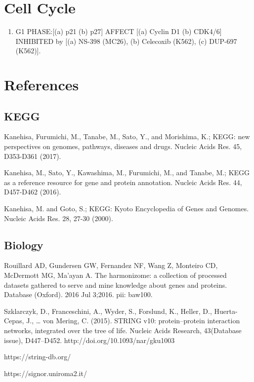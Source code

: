 

\section{Cell Cycle}

\begin{enumerate}
	\item G1 PHASE:[(a) p21 (b) p27] AFFECT [(a) Cyclin D1 (b) CDK4/6] INHIBITED by [(a) NS-398 (MC26), (b) Celecoxib (K562), (c) DUP-697 (K562)]. \cite{key4000}
\end{enumerate}


\section{References}


\subsection{KEGG}

 Kanehisa, Furumichi, M., Tanabe, M., Sato, Y., and Morishima, K.; 
\newblock KEGG: new perspectives on genomes, pathways, diseases and drugs. 
\newblock Nucleic Acids Res. 45, D353-D361 (2017).

 Kanehisa, M., Sato, Y., Kawashima, M., Furumichi, M., and Tanabe, M.; 
\newblock KEGG as a reference resource for gene and protein annotation. 
\newblock Nucleic Acids Res. 44, D457-D462 (2016).

 Kanehisa, M. and Goto, S.; 
\newblock KEGG: Kyoto Encyclopedia of Genes and Genomes. 
\newblock Nucleic Acids Res. 28, 27-30 (2000). 

\subsection{Biology}

 Rouillard AD, Gundersen GW, Fernandez NF, Wang Z, Monteiro CD, McDermott MG, Ma'ayan A. 
\newblock The harmonizome: a collection of processed datasets gathered to serve and mine knowledge about genes and proteins. 
\newblock Database (Oxford). 2016 Jul 3;2016. pii: baw100.

Szklarczyk, D., Franceschini, A., Wyder, S., Forslund, K., Heller, D., Huerta-Cepas, J., … von Mering, C. (2015). 
\newblock STRING v10: protein–protein interaction networks, integrated over the tree of life. 
\newblock Nucleic Acids Research, 43(Database issue), D447–D452. http://doi.org/10.1093/nar/gku1003

 https://string-db.org/

https://signor.uniroma2.it/

